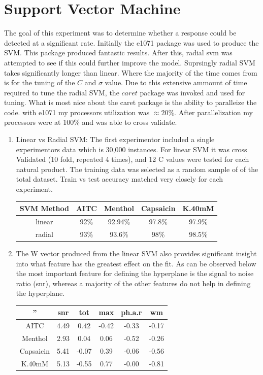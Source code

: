 \documentclass[11pt, fullpage,letterpaper]{article}
\begin{document}
\section{Support Vector Machine}

The goal of this experiment was to determine whether a response could be detected at a significant rate. Initially the e1071 package was used to produce the SVM. This package produced fantastic results. After this, radial svm was attempted to see if this could further improve the model. Suprsingly radial SVM takes significantly longer than linear. Where the majority of the time comes from is for the tuning of the $C$ and $\sigma$ value. Due to this extensive ammount of time required to tune the radial SVM, the $caret$ package was invoked and used for tuning.  What is most nice about the caret package is the ability to paralleize the code. with e1071 my processors utilization was $\approx 20\%$. After parallelization my processors were at 100\% and was able to cross validate.

\begin{enumerate}
	\item Linear vs Radial SVM: The first experimentor included a single experimentors data which is 30,000 instances. For linear SVM it was cross Validated (10 fold, repeated 4 times), and 12 C values were tested for each natural product. The training data was selected as a random sample of  of the total dataset. Train vs test accuracy matched very closely for each experiment.
		\begin{center}
		\begin{tabular} {c|cccc}
			SVM Method & AITC & Menthol & Capsaicin & K.40mM \\ \hline \hline
			linear & 92\% & 92.94\% & 97.8\% & 97.9\% \\ \hline
			radial & 93\% & 93.6\% & 98\% & 98.5\% \\ \hline
		\end{tabular}
	\end{center}	
	\item The W vector produced from the linear SVM also provides significant insight into what feature has the greatest effect on the fit. As can be observed below the most important feature for defining the hyperplane is the signal to noise ratio (snr), whereas a majority of the other features do not help in defining the hyperplane.
	\begin{center}
		\begin{tabular}{c|ccccc}
			''& snr & tot & max & ph.a.r & wm \\ \hline \hline
			AITC & 4.49 & 0.42 & -0.42 & -0.33 & -0.17 \\ \hline
			Menthol & 2.93 & 0.04 & 0.06 & -0.52 & -0.26 \\ \hline
			Capsaicin & 5.41 & -0.07 & 0.39 & -0.06 & -0.56 \\ \hline
			K.40mM & 5.13 & -0.55 & 0.77 & -0.00 & -0.81 \\ \hline
		\end{tabular}
	\end{center}
\end{enumerate}
\end{document}
